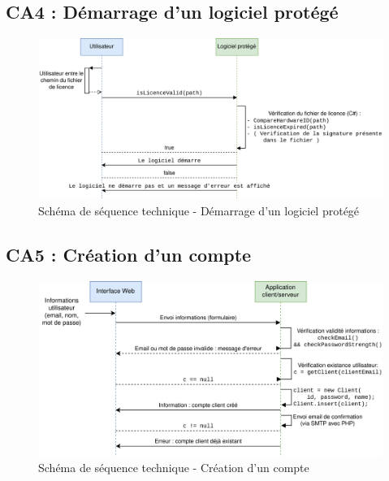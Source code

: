 \subsection{CA4 : Démarrage d'un logiciel protégé}
\begin{figure}[!h]
    \centering
    \includegraphics[width=15cm]{../png/SSD-demarrage-logiciel.png}
    \caption{Schéma de séquence technique - Démarrage d'un logiciel protégé}
\end{figure}
\newpage

\subsection{CA5 : Création d'un compte}
\begin{figure}[!h]
    \centering
    \includegraphics[width=15cm]{../png/SSD-creation-compte.png}
    \caption{Schéma de séquence technique - Création d'un compte}
\end{figure}

